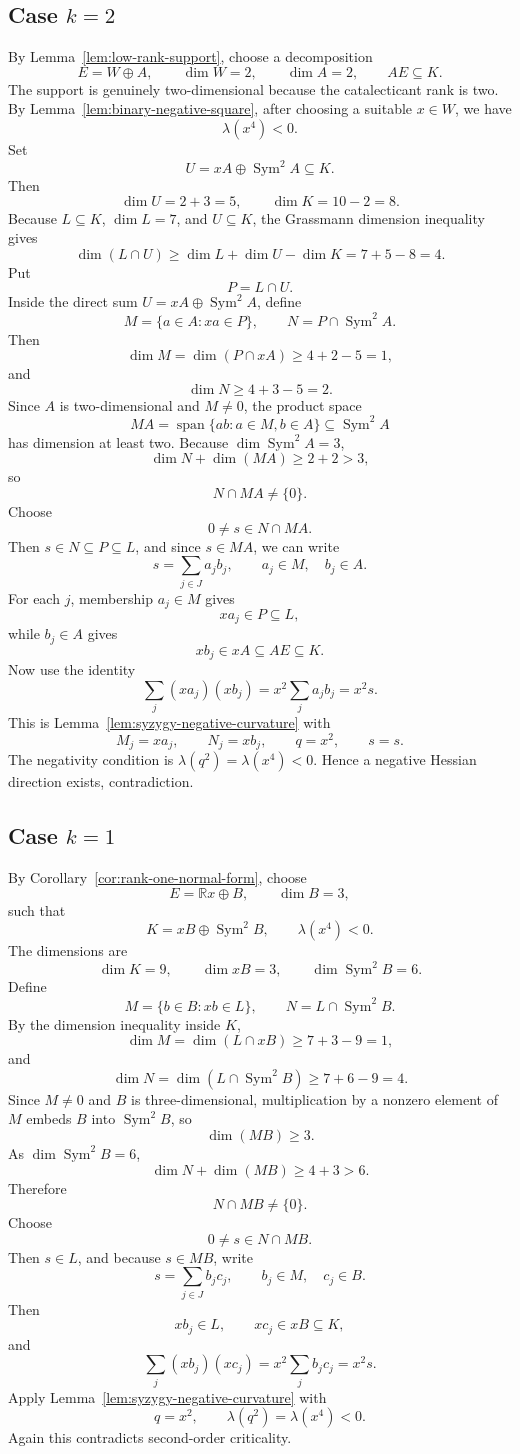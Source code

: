 \documentclass[11pt]{article}
\newcommand{\R}{\mathbb R}
\newcommand{\Span}{\operatorname{span}}
\newcommand{\Sym}{\operatorname{Sym}}
\begin{document}
\subsection{Case \(k=2\)}

By Lemma~\ref{lem:low-rank-support}, choose a decomposition
\[
E=W\oplus A,
\qquad
\dim W=2,
\qquad
\dim A=2,
\qquad
AE\subseteq K.
\]
The support is genuinely two-dimensional because the catalecticant rank is two.  By Lemma~\ref{lem:binary-negative-square}, after choosing a suitable \(x\in W\), we have
\[
\lambda(x^4)<0.
\]
Set
\[
U=xA\oplus\Sym^2A\subseteq K.
\]
Then
\[
\dim U=2+3=5,
\qquad
\dim K=10-2=8.
\]
Because \(L\subseteq K\), \(\dim L=7\), and \(U\subseteq K\), the Grassmann dimension inequality gives
\[
\dim(L\cap U)
\ge
\dim L+
\dim U-
\dim K
=7+5-8=4.
\]
Put
\[
P=L\cap U.
\]
Inside the direct sum \(U=xA\oplus\Sym^2A\), define
\[
M=\{a\in A: xa\in P\},
\qquad
N=P\cap\Sym^2A.
\]
Then
\[
\dim M=\dim(P\cap xA)
\ge 4+2-5=1,
\]
and
\[
\dim N
\ge 4+3-5=2.
\]
Since \(A\) is two-dimensional and \(M\ne0\), the product space
\[
MA=\Span\{ab:a\in M,b\in A\}\subseteq\Sym^2A
\]
has dimension at least two.  Because \(\dim\Sym^2A=3\),
\[
\dim N+
\dim(MA)
\ge2+2>3,
\]
so
\[
N\cap MA\ne\{0\}.
\]
Choose
\[
0\ne s\in N\cap MA.
\]
Then \(s\in N\subseteq P\subseteq L\), and since \(s\in MA\), we can write
\[
s=\sum_{j\in J}a_jb_j,
\qquad
a_j\in M,
\quad b_j\in A.
\]
For each \(j\), membership \(a_j\in M\) gives
\[
xa_j\in P\subseteq L,
\]
while \(b_j\in A\) gives
\[
xb_j\in xA\subseteq AE\subseteq K.
\]
Now use the identity
\[
\sum_j(xa_j)(xb_j)
=x^2\sum_j a_jb_j
=x^2s.
\]
This is Lemma~\ref{lem:syzygy-negative-curvature} with
\[
M_j=xa_j,
\qquad
N_j=xb_j,
\qquad
q=x^2,
\qquad
s=s.
\]
The negativity condition is \(\lambda(q^2)=\lambda(x^4)<0\).  Hence a negative Hessian direction exists, contradiction.

\subsection{Case \(k=1\)}

By Corollary~\ref{cor:rank-one-normal-form}, choose
\[
E=\R x\oplus B,
\qquad
\dim B=3,
\]
such that
\[
K=xB\oplus\Sym^2B,
\qquad
\lambda(x^4)<0.
\]
The dimensions are
\[
\dim K=9,
\qquad
\dim xB=3,
\qquad
\dim\Sym^2B=6.
\]
Define
\[
M=\{b\in B: xb\in L\},
\qquad
N=L\cap\Sym^2B.
\]
By the dimension inequality inside \(K\),
\[
\dim M
=
\dim(L\cap xB)
\ge 7+3-9=1,
\]
and
\[
\dim N
=
\dim(L\cap\Sym^2B)
\ge 7+6-9=4.
\]
Since \(M\ne0\) and \(B\) is three-dimensional, multiplication by a nonzero element of \(M\) embeds \(B\) into \(\Sym^2B\), so
\[
\dim(MB)
\ge3.
\]
As \(\dim\Sym^2B=6\),
\[
\dim N+
\dim(MB)
\ge4+3>6.
\]
Therefore
\[
N\cap MB\ne\{0\}.
\]
Choose
\[
0\ne s\in N\cap MB.
\]
Then \(s\in L\), and because \(s\in MB\), write
\[
s=\sum_{j\in J}b_jc_j,
\qquad
b_j\in M,
\quad c_j\in B.
\]
Then
\[
xb_j\in L,
\qquad
xc_j\in xB\subseteq K,
\]
and
\[
\sum_j(xb_j)(xc_j)
=x^2\sum_j b_jc_j
=x^2s.
\]
Apply Lemma~\ref{lem:syzygy-negative-curvature} with
\[
q=x^2,
\qquad
\lambda(q^2)=\lambda(x^4)<0.
\]
Again this contradicts second-order criticality.
\end{document}
